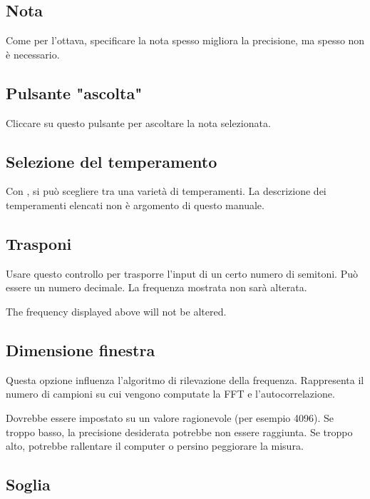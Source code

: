 \subsection{Nota}\label{note}

Come per l'ottava, specificare la nota spesso migliora la precisione,
ma spesso non è necessario.

\subsection{Pulsante "ascolta"}\label{listen}

Cliccare su questo pulsante per ascoltare la nota selezionata.

\subsection{Selezione del temperamento}\label{temperament}

Con , si può scegliere tra una varietà di temperamenti.
La descrizione dei temperamenti elencati non è argomento di questo
manuale.

\subsection{Trasponi}\label{transpose}

Usare questo controllo per trasporre l'input di un certo numero
di semitoni. Può essere un numero decimale. La frequenza
mostrata non sarà alterata.

The frequency displayed above will not be altered.

\subsection{Dimensione finestra}\label{windowsize}

Questa opzione influenza l'algoritmo di rilevazione della frequenza.
Rappresenta il numero di campioni su cui vengono computate la FFT
e l'autocorrelazione.

Dovrebbe essere impostato su un valore ragionevole (per esempio 4096).
Se troppo basso, la precisione desiderata potrebbe non essere
raggiunta. Se troppo alto, potrebbe rallentare il computer o
persino peggiorare la misura.

\subsection{Soglia}\label{threshold}

